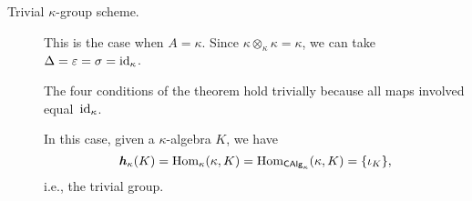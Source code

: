 \begin{xmpls}${}$\label{xmpls:k-group-schemes}
    \begin{description}
        \item[\quad Trivial $\kappa$-group scheme.] This is the case when $A=\kappa$. Since $\kappa\otimes_\kappa\kappa = \kappa$, we can take $\Delta=\varepsilon=\sigma=\text{\rm id}_\kappa$.

        The four conditions of the theorem hold trivially because all maps involved equal~$\text{\rm id}_\kappa$.

        In this case, given a $\kappa$-algebra $K$, we have
        $$
            \textrm{\boldmath$\mathit h$}_\kappa(K)
                ={\rm Hom}_\kappa(\kappa, K)
                ={\rm Hom}_{\mathsf{CAlg}_\kappa}(\kappa,K)
                =\{\iota_K\},
        $$
        i.e., the trivial group.
        

\end{description}
\end{xmpls}
